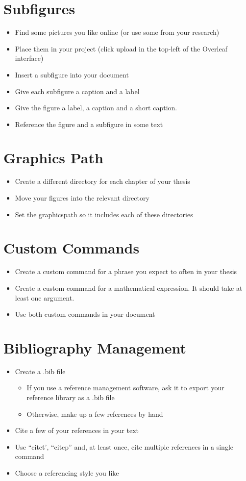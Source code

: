 \documentclass[11pt,a4paper]{article}
\begin{document}
\section{Subfigures}
\begin{itemize}
\item Find some pictures you like online (or use some from your research)
\item Place them in your project (click upload in the top-left of the Overleaf interface)
\item Insert a subfigure into your document
\item Give each subfigure a caption and a label
\item Give the figure a label, a caption and a short caption.
\item Reference the figure and a subfigure in some text
\end{itemize}

\section{Graphics Path}
\begin{itemize}
\item Create a different directory for each chapter of your thesis
\item Move your figures into the relevant directory
\item Set the graphicspath so it includes each of these directories
\end{itemize}

\section{Custom Commands}
\begin{itemize}
\item Create a custom command for a phrase you expect to often in your thesis
\item Create a custom command for a mathematical expression. It should take at least one argument.
\item Use both custom commands in your document
\end{itemize}

\section{Bibliography Management}
\begin{itemize}
\item Create a .bib file
\begin{itemize}
\item If you use a reference management software, ask it to export your reference library as a .bib file
\item Otherwise, make up a few references by hand
\end{itemize}
\item Cite a few of your references in your text
\item Use ``citet', ``citep'' and, at least once,  cite multiple references in a single command
\item Choose a referencing style you like
\end{itemize}
\end{document}
